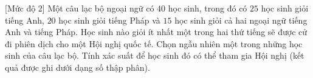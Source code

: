 \begin{bt}%
[Mức độ 2]%
	Một câu lạc bộ ngoại ngữ có $40$ học sinh, trong đó có $25$ học sinh giỏi tiếng Anh, $20$ học sinh giỏi tiếng Pháp và $15$ học sinh giỏi cả hai ngoại ngữ tiếng Anh và tiếng Pháp. Học sinh nào giỏi ít nhất một trong hai thứ tiếng sẽ được cử đi phiên dịch cho một Hội nghị quốc tế. Chọn ngẫu nhiên một trong những học sinh của câu lạc bộ. Tính xác suất để học sinh đó có thể tham gia Hội nghị (kết quả được ghi dưới dạng số thập phân).
\end{bt}

